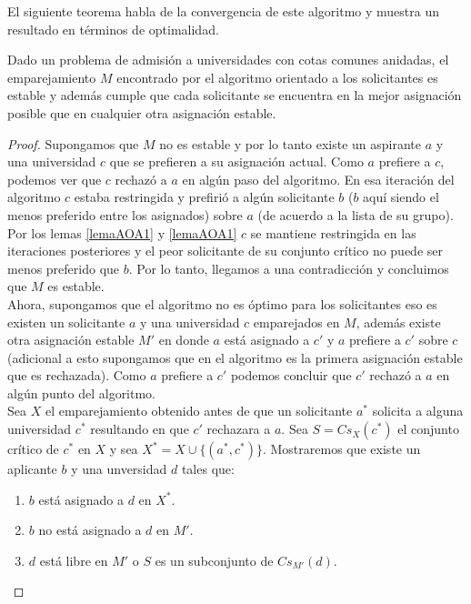 El siguiente teorema habla de la convergencia de este algoritmo y muestra un resultado en términos de optimalidad.

\begin{teo}
Dado un problema de admisión a universidades con cotas comunes anidadas, el emparejamiento $M$ encontrado por el algoritmo orientado a los solicitantes es estable y además cumple que cada solicitante se encuentra en la mejor asignación posible que en cualquier otra asignación estable.
\end{teo}

\begin{proof}
Supongamos que $M$ no es estable y por lo tanto existe un aspirante $a$ y una universidad $c$ que se prefieren a su asignación actual. Como $a$ prefiere a $c$, podemos ver que $c$ rechazó a $a$ en algún paso del algoritmo. En esa iteración del algoritmo $c$ estaba restringida y prefirió a algún solicitante $b$ ($b$ aquí siendo el menos preferido entre los asignados) sobre $a$ (de acuerdo a la lista de su grupo). Por los lemas \ref{lemaAOA1} y \ref{lemaAOA1} $c$ se mantiene restringida en las iteraciones posteriores y el peor solicitante de su conjunto crítico no puede ser menos preferido que $b$. Por lo tanto, llegamos a una contradicción y concluimos que $M$ es estable. \\
Ahora, supongamos que el algoritmo no es óptimo para los solicitantes eso es existen un solicitante $a$ y una universidad $c$ emparejados en $M$, además existe otra asignación estable $M'$ en donde $a$ está asignado a $c'$ y $a$ prefiere a $c'$ sobre $c$ (adicional a esto supongamos que en el algoritmo es la primera asignación estable que es rechazada). Como $a$ prefiere a $c'$ podemos concluir que $c'$ rechazó a $a$ en algún punto del algoritmo. \\
Sea $X$ el emparejamiento obtenido antes de que un solicitante $a^*$ solicita a alguna universidad $c^*$ resultando en que $c'$ rechazara a $a$. Sea $S=Cs_X(c^*)$ el conjunto crítico de $c^*$ en $X$ y sea $X^*=X \cup \{(a^*,c^*)\}$. Mostraremos que existe un aplicante $b$ y una unversidad $d$ tales que:
\begin{enumerate}
\item $b$ está asignado a $d$ en $X^*$.
\item $b$ no está asignado a $d$ en $M'$.
\item $d$ está libre en $M'$ o $S$ es un subconjunto de $Cs_{M'}(d)$.
\end{enumerate}

\end{proof}
